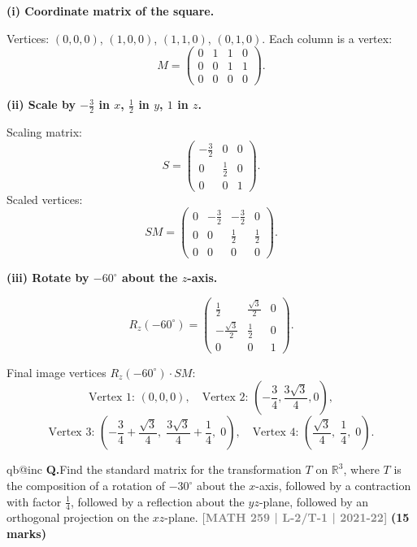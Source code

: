\documentclass[12pt,a3paper]{article}
\makeatletter
\newcommand{\yr}[1]{\hfill\textcolor{gray}{\small\textbf{[#1]}}}
\newcommand{\mk}[1]{\textcolor{orange!70!black}{\small\textbf{(#1 marks)}}}
\newcounter{qnum}
\newcommand{\Q}[1]{%
  \csname qb@inc\endcsname
  \needspace{4\baselineskip}
  \refstepcounter{qnum}
  \vspace{6pt}
  \noindent\textbf{Q\theqnum.}\enspace #1\par
}
\makeatother
\begin{document}
\begin{tcolorbox}[enhanced,breakable,
  colback=cF!4,colframe=cF,boxrule=0.8pt,arc=5pt,
  title={\textbf{Answer --- Square: Coordinate Matrix, Scaling, Rotation by $-60^\circ$ about $z$}},
  fonttitle=\bfseries\color{white},colbacktitle=cF]

\textbf{(i) Coordinate matrix of the square.}

Vertices: $(0,0,0)$, $(1,0,0)$, $(1,1,0)$, $(0,1,0)$. Each column is a vertex:
\[
M=\begin{pmatrix}0&1&1&0\\0&0&1&1\\0&0&0&0\end{pmatrix}.
\]

\textbf{(ii) Scale by $-\tfrac{3}{2}$ in $x$, $\tfrac{1}{2}$ in $y$, $1$ in $z$.}

Scaling matrix:
\[
S=\begin{pmatrix}-\frac{3}{2}&0&0\\0&\frac{1}{2}&0\\0&0&1\end{pmatrix}.
\]
Scaled vertices:
\[
SM=\begin{pmatrix}0&-\frac{3}{2}&-\frac{3}{2}&0\\0&0&\frac{1}{2}&\frac{1}{2}\\0&0&0&0\end{pmatrix}.
\]

\textbf{(iii) Rotate by $-60^\circ$ about the $z$-axis.}

\[
R_z(-60^\circ)=\begin{pmatrix}\frac{1}{2}&\frac{\sqrt{3}}{2}&0\\-\frac{\sqrt{3}}{2}&\frac{1}{2}&0\\0&0&1\end{pmatrix}.
\]

Final image vertices $R_z(-60^\circ)\cdot SM$:
\[
\text{Vertex 1: }(0,0,0),\quad
\text{Vertex 2: }\left(-\frac{3}{4},\frac{3\sqrt{3}}{4},0\right),
\]
\[
\text{Vertex 3: }\left(-\frac{3}{4}+\frac{\sqrt{3}}{4},\;\frac{3\sqrt{3}}{4}+\frac{1}{4},\;0\right),\quad
\text{Vertex 4: }\left(\frac{\sqrt{3}}{4},\;\frac{1}{4},\;0\right).
\]

\end{tcolorbox}

\Q{Find the standard matrix for the transformation $T$ on $\mathbb{R}^3$, where $T$ is the composition of a rotation of $-30^\circ$ about the $x$-axis, followed by a contraction with factor $\frac{1}{4}$, followed by a reflection about the $yz$-plane, followed by an orthogonal projection on the $xz$-plane.
\yr{MATH 259 | L-2/T-1 | 2021-22} \mk{15}}
\end{document}
